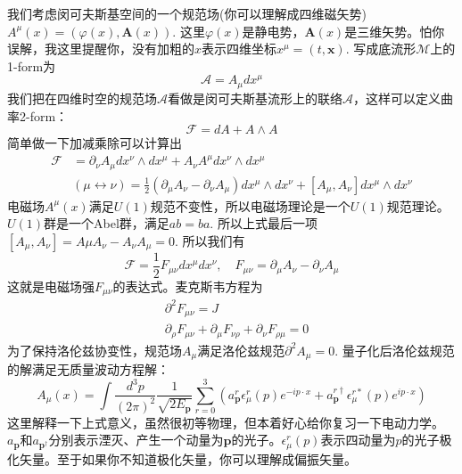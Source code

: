 \documentclass[a4paper]{article}
\begin{document}
    我们考虑闵可夫斯基空间的一个规范场(你可以理解成四维磁矢势)$A^\mu(x)=(\varphi(x),\mathbf{A}(x))$. 这里$\varphi(x)$是静电势，$\mathbf{A}(x)$是三维矢势。怕你误解，我这里提醒你，没有加粗的$x$表示四维坐标$x^\mu=(t,\mathbf{x})$. 写成底流形$\mathcal{M}$上的1-form为
    \begin{equation}
        \mathcal{A}=A_\mu dx^\mu
    \end{equation}
    我们把在四维时空的规范场$\mathcal{A}$看做是闵可夫斯基流形上的联络$\mathcal{A}$，这样可以定义曲率2-form：
    \begin{equation}
        \mathcal{F}=dA+A\wedge A
    \end{equation}
    简单做一下加减乘除可以计算出
    \begin{equation}
        \begin{split}
            \mathcal{F}&=\partial_\nu A_\mu dx^\nu\wedge dx^\mu+A_\nu A^\mu dx^\nu\wedge dx^\mu\\
            &(\mu\leftrightarrow\nu)=\frac{1}{2}(\partial_\mu A_\nu-\partial_\nu A_\mu)dx^\mu\wedge dx^\nu+[A_\mu,A_\nu]dx^\mu\wedge dx^\nu
        \end{split}
    \end{equation}
    电磁场$A^\mu(x)$满足$U(1)$规范不变性，所以电磁场理论是一个$U(1)$规范理论。$U(1)$群是一个Abel群，满足$ab=ba$. 所以上式最后一项$[A_\mu,A_\nu]=A\mu A_\nu-A_\nu A_\mu=0$. 所以我们有
    \begin{equation}
        \mathcal{F}=\frac{1}{2}F_{\mu\nu}dx^\mu dx^\nu,\quad F_{\mu\nu}=\partial_\mu A_\nu-\partial_\nu A_\mu
    \end{equation}
    这就是电磁场强$F_{\mu\nu}$的表达式。麦克斯韦方程为
    \begin{equation}
        \begin{split}
            &\partial^2 F_{\mu\nu}=J\\
            &\partial_\rho F_{\mu\nu}+\partial_\mu F_{\nu\rho}+\partial_{\nu}F_{\rho\mu}=0
        \end{split}
    \end{equation}
    为了保持洛伦兹协变性，规范场$A_\mu$满足洛伦兹规范$\partial^2A_\mu=0$. 量子化后洛伦兹规范的解满足无质量波动方程解：
    \begin{equation}
        A_\mu(x)=\int\frac{d^3p}{(2\pi)^2}\frac{1}{\sqrt{2E_{\mathbf{p}}}}\sum_{r=0}^3\left(a_{\mathbf{p}}^r\epsilon_\mu^r(p)e^{-ip\cdot x}+a_{\mathbf{p}}^{r\dagger}\epsilon_\mu^{r*}(p)e^{ip\cdot x}\right)
    \end{equation}
    这里解释一下上式意义，虽然很初等物理，但本着好心给你复习一下电动力学。$a_\mathbf{p}$和$a_{\mathbf{p}^\dagger}$分别表示湮灭、产生一个动量为$\mathbf{p}$的光子。$\epsilon_{\mu}^r(p)$表示四动量为$p$的光子极化矢量。至于如果你不知道极化矢量，你可以理解成偏振矢量。
\end{document}
